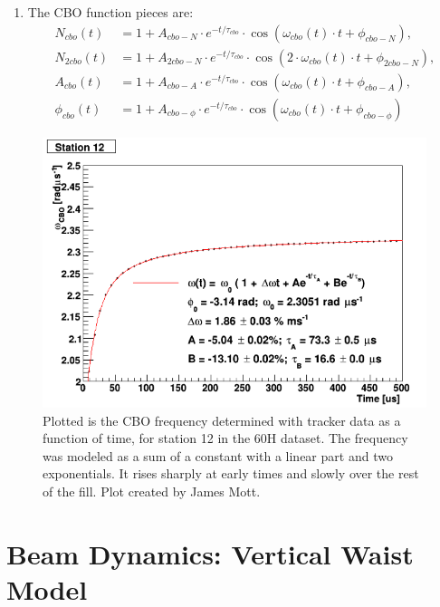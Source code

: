 \begin{enumerate}
		\item{The CBO function pieces are:
			\begin{equation}	
			\begin{aligned}
					N_{cbo}(t) &= 1 + A_{cbo-N} \cdot e^{-t/\tau_{cbo}} \cdot \cos(\omega_{cbo}(t) \cdot t + \phi_{cbo-N}), \\
					N_{2cbo}(t) &= 1 + A_{2cbo-N} \cdot e^{-t/\tau_{cbo}} \cdot \cos(2 \cdot \omega_{cbo}(t) \cdot t + \phi_{2cbo-N}), \\
					A_{cbo}(t) &= 1 + A_{cbo-A} \cdot e^{-t/\tau_{cbo}} \cdot \cos(\omega_{cbo}(t) \cdot t + \phi_{cbo-A}), \\
					\phi_{cbo}(t) &= 1 + A_{cbo-\phi} \cdot e^{-t/\tau_{cbo}} \cdot \cos(\omega_{cbo}(t) \cdot t + \phi_{cbo-\phi})
			\label{eqn:CBO}
			\end{aligned}
			\end{equation}
		}
	\end{enumerate}

	\begin{figure}[]
		\centering
		\includegraphics[width=\textwidth]{TrackerCBOModel}
	    \caption[TrackerCBOModel]{Plotted is the CBO frequency determined with tracker data as a function of time, for station 12 in the 60H dataset. The frequency was modeled as a sum of a constant with a linear part and two exponentials. It rises sharply at early times and slowly over the rest of the fill. Plot created by James Mott.}
	    \label{fig:TrackerCBOModel}
	\end{figure}


\section{Beam Dynamics: Vertical Waist Model}
\label{Sec:VW}

